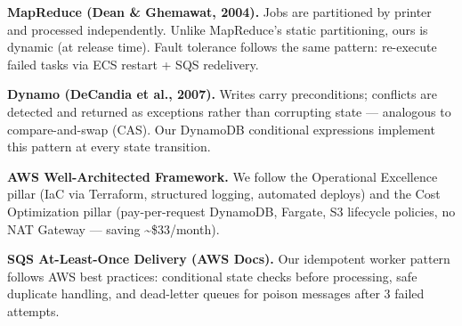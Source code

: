 \documentclass[11pt,letterpaper]{article}
\begin{document}
\textbf{MapReduce (Dean \& Ghemawat, 2004).} Jobs are partitioned by printer and processed independently. Unlike MapReduce's static partitioning, ours is dynamic (at release time). Fault tolerance follows the same pattern: re-execute failed tasks via ECS restart + SQS redelivery.

\textbf{Dynamo (DeCandia et al., 2007).} Writes carry preconditions; conflicts are detected and returned as exceptions rather than corrupting state --- analogous to compare-and-swap (CAS). Our DynamoDB conditional expressions implement this pattern at every state transition.

\textbf{AWS Well-Architected Framework.} We follow the Operational Excellence pillar (IaC via Terraform, structured logging, automated deploys) and the Cost Optimization pillar (pay-per-request DynamoDB, Fargate, S3 lifecycle policies, no NAT Gateway --- saving \textasciitilde\$33/month).

\textbf{SQS At-Least-Once Delivery (AWS Docs).} Our idempotent worker pattern follows AWS best practices: conditional state checks before processing, safe duplicate handling, and dead-letter queues for poison messages after 3 failed attempts.
\end{document}
